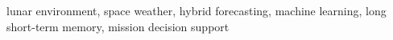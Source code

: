 lunar environment, space weather, hybrid forecasting, machine learning, long short-term memory, mission decision support
